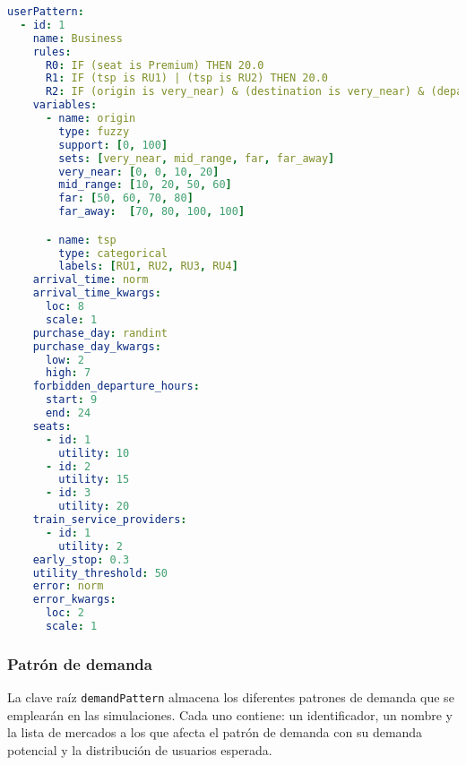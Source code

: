 \begin{lstlisting}[language=YAML,
                   frame=none,
                   numbers=none,
                   basicstyle=\ttfamily\normalsize,
                   caption={Ejemplo con datos reales de la estructura de \texttt{userPattern}},
                   label=src:ejemploEstructuraUserPattern,
                   inputencoding=utf8]
userPattern:
  - id: 1
    name: Business
    rules:
      R0: IF (seat is Premium) THEN 20.0
      R1: IF (tsp is RU1) | (tsp is RU2) THEN 20.0
      R2: IF (origin is very_near) & (destination is very_near) & (departure_time is in_time) & (arrival_time is in_time) THEN 60.0
    variables:
      - name: origin
        type: fuzzy
        support: [0, 100]
        sets: [very_near, mid_range, far, far_away]
        very_near: [0, 0, 10, 20]
        mid_range: [10, 20, 50, 60]
        far: [50, 60, 70, 80]
        far_away:  [70, 80, 100, 100]

      - name: tsp
        type: categorical
        labels: [RU1, RU2, RU3, RU4]
    arrival_time: norm
    arrival_time_kwargs:
      loc: 8
      scale: 1
    purchase_day: randint
    purchase_day_kwargs:
      low: 2
      high: 7
    forbidden_departure_hours:
      start: 9
      end: 24
    seats:
      - id: 1
        utility: 10
      - id: 2
        utility: 15
      - id: 3
        utility: 20
    train_service_providers:
      - id: 1
        utility: 2
    early_stop: 0.3
    utility_threshold: 50
    error: norm
    error_kwargs:
      loc: 2
      scale: 1
\end{lstlisting}

\subsubsection{Patrón de demanda}

La clave raíz \texttt{demandPattern} almacena los diferentes patrones de demanda que se emplearán en las simulaciones. Cada uno contiene: un identificador, un nombre y la lista de mercados a los que afecta el patrón de demanda con su demanda potencial y la distribución de usuarios esperada.

